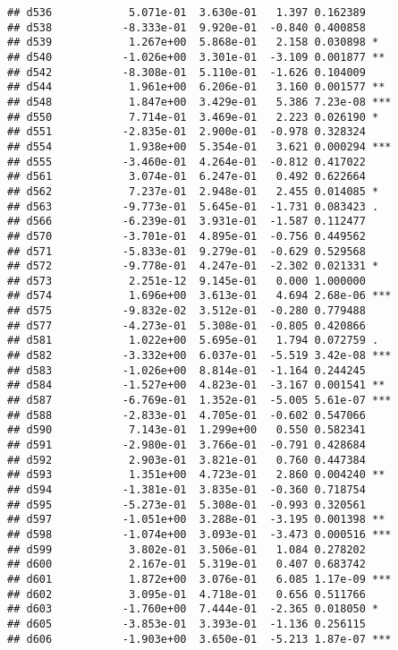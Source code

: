 \documentclass[
]{article}
\begin{document}
\begin{verbatim}
## d536            5.071e-01  3.630e-01   1.397 0.162389    
## d538           -8.333e-01  9.920e-01  -0.840 0.400858    
## d539            1.267e+00  5.868e-01   2.158 0.030898 *  
## d540           -1.026e+00  3.301e-01  -3.109 0.001877 ** 
## d542           -8.308e-01  5.110e-01  -1.626 0.104009    
## d544            1.961e+00  6.206e-01   3.160 0.001577 ** 
## d548            1.847e+00  3.429e-01   5.386 7.23e-08 ***
## d550            7.714e-01  3.469e-01   2.223 0.026190 *  
## d551           -2.835e-01  2.900e-01  -0.978 0.328324    
## d554            1.938e+00  5.354e-01   3.621 0.000294 ***
## d555           -3.460e-01  4.264e-01  -0.812 0.417022    
## d561            3.074e-01  6.247e-01   0.492 0.622664    
## d562            7.237e-01  2.948e-01   2.455 0.014085 *  
## d563           -9.773e-01  5.645e-01  -1.731 0.083423 .  
## d566           -6.239e-01  3.931e-01  -1.587 0.112477    
## d570           -3.701e-01  4.895e-01  -0.756 0.449562    
## d571           -5.833e-01  9.279e-01  -0.629 0.529568    
## d572           -9.778e-01  4.247e-01  -2.302 0.021331 *  
## d573            2.251e-12  9.145e-01   0.000 1.000000    
## d574            1.696e+00  3.613e-01   4.694 2.68e-06 ***
## d575           -9.832e-02  3.512e-01  -0.280 0.779488    
## d577           -4.273e-01  5.308e-01  -0.805 0.420866    
## d581            1.022e+00  5.695e-01   1.794 0.072759 .  
## d582           -3.332e+00  6.037e-01  -5.519 3.42e-08 ***
## d583           -1.026e+00  8.814e-01  -1.164 0.244245    
## d584           -1.527e+00  4.823e-01  -3.167 0.001541 ** 
## d587           -6.769e-01  1.352e-01  -5.005 5.61e-07 ***
## d588           -2.833e-01  4.705e-01  -0.602 0.547066    
## d590            7.143e-01  1.299e+00   0.550 0.582341    
## d591           -2.980e-01  3.766e-01  -0.791 0.428684    
## d592            2.903e-01  3.821e-01   0.760 0.447384    
## d593            1.351e+00  4.723e-01   2.860 0.004240 ** 
## d594           -1.381e-01  3.835e-01  -0.360 0.718754    
## d595           -5.273e-01  5.308e-01  -0.993 0.320561    
## d597           -1.051e+00  3.288e-01  -3.195 0.001398 ** 
## d598           -1.074e+00  3.093e-01  -3.473 0.000516 ***
## d599            3.802e-01  3.506e-01   1.084 0.278202    
## d600            2.167e-01  5.319e-01   0.407 0.683742    
## d601            1.872e+00  3.076e-01   6.085 1.17e-09 ***
## d602            3.095e-01  4.718e-01   0.656 0.511766    
## d603           -1.760e+00  7.444e-01  -2.365 0.018050 *  
## d605           -3.853e-01  3.393e-01  -1.136 0.256115    
## d606           -1.903e+00  3.650e-01  -5.213 1.87e-07 ***

\end{verbatim}
\end{document}
